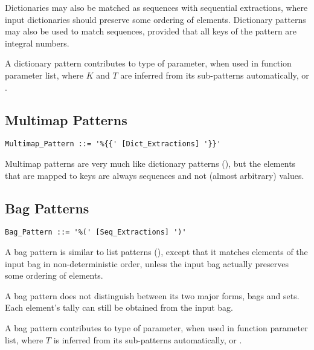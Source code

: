 Dictionaries may also be matched as sequences with sequential extractions, where input dictionaries should preserve some ordering of elements. Dictionary patterns may also be used to match sequences, provided that all keys of the pattern are integral numbers. 

A dictionary pattern contributes  to type of parameter, when used in function parameter list, where $K$ and $T$ are inferred from its sub-patterns automatically, or . 





\subsection{Multimap Patterns}
\label{sec:multimap-patterns}

\grammar\begin{lstlisting}
Multimap_Pattern ::= '%{{' [Dict_Extractions] '}}'
\end{lstlisting}

Multimap patterns are very much like dictionary patterns (), but the elements that are mapped to keys are always sequences and not (almost arbitrary) values. 





\subsection{Bag Patterns}
\label{sec:bag-patterns}

\grammar\begin{lstlisting}
Bag_Pattern ::= '%(' [Seq_Extractions] ')'
\end{lstlisting}

A bag pattern is similar to list patterns (), except that it matches elements of the input bag in non-deterministic order, unless the input bag actually preserves some ordering of elements. 

A bag pattern does not distinguish between its two major forms, bags and sets. Each element's tally can still be obtained from the input bag. 

A bag pattern contributes  to type of parameter, when used in function parameter list, where $T$ is inferred from its sub-patterns automatically, or . 





